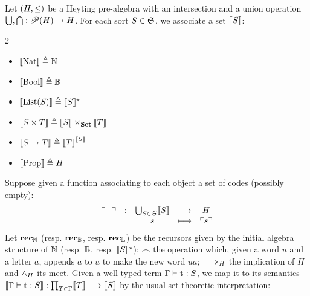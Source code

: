 \documentclass[a4paper,UKenglish,cleveref, autoref, thm-restate]{lipics-v2021}
\begin{document}
\begin{definition}[Semantics]\label{def:sem}
  Let $(H,\leq)$ be a Heyting pre-algebra with an intersection and a union operation $\bigcup,\bigcap : \mathscr{P} (H) \to H$.
  For each sort $S \in \mathfrak S$, we associate a set $\llbracket S \rrbracket$:
  \begin{multicols}{2}
  \begin{itemize}
  \item $\llbracket \mathrm{Nat} \rrbracket \triangleq \mathbb N$
  \item $\llbracket \mathrm{Bool} \rrbracket \triangleq \mathbb B$
  \item $\llbracket \mathrm{List}(S) \rrbracket \triangleq \llbracket S \rrbracket ^\star$
  \item $\llbracket S \times T \rrbracket \triangleq \llbracket S \rrbracket \times_{\mathbf{Set}} \llbracket T \rrbracket$
  \item $\llbracket S \to T \rrbracket \triangleq {\llbracket T \rrbracket}^{\llbracket S \rrbracket}$
  \item $\llbracket \mathrm{Prop} \rrbracket \triangleq H$
  \end{itemize}
  \end{multicols}
  \noindent Suppose given a function associating to each object a set of codes (possibly empty):
  \[\begin{array}{ccccc}
  \ulcorner-\urcorner &:& \bigcup_{S \in \mathfrak S} \llbracket S \rrbracket & \longrightarrow & H \\
  & & s &\longmapsto & \ulcorner s\urcorner
  \end{array}\]
  Let $\textbf{rec}_{\mathbb N}$ (resp. $\textbf{rec}_{\mathbb B}$, resp. $\textbf{rec}_{\mathbb L}$) be the recursors given by the initial algebra structure of $\mathbb N$ (resp. $\mathbb B$, resp. $\llbracket S \rrbracket^\star$); $\smallfrown$ the operation which, given a word $u$ and a letter $a$, appends $a$ to $u$ to make the new word $ua$; $\implies\!\!\!_H$ the implication of $H$ and $\land_H$ its meet.
  Given a well-typed term $\Gamma \vdash \mathbf{t} : S$, we map it to its semantics
  $ \llbracket \Gamma \vdash \mathbf{t} : S \rrbracket : \prod_{T \in \Gamma} \llbracket T \rrbracket \longrightarrow \llbracket S \rrbracket$
  by the usual set-theoretic interpretation:


\end{definition}
\end{document}
